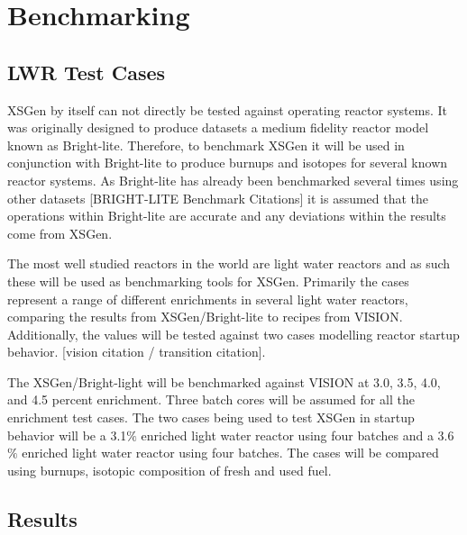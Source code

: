 \documentclass{article}
\begin{document}
\section{Benchmarking}
\subsection{LWR Test Cases}
XSGen by itself can not directly be tested against operating reactor systems. It was originally designed to produce datasets a medium fidelity reactor model known as Bright-lite. Therefore, to benchmark XSGen it will be used in conjunction with Bright-lite to produce burnups and isotopes for several known reactor systems.  As Bright-lite has already been benchmarked several times using other datasets [BRIGHT-LITE Benchmark Citations] it is assumed that the operations within Bright-lite are accurate and any deviations within the results come from XSGen.

The most well studied reactors in the world are light water reactors and as such these will be used as benchmarking tools for XSGen. Primarily the cases represent a range of different enrichments in several light water reactors, comparing the results from XSGen/Bright-lite to recipes from VISION. Additionally, the values will be tested against two cases modelling reactor startup behavior.  [vision citation / transition citation].

The XSGen/Bright-light will be benchmarked against VISION at 3.0, 3.5, 4.0, and 4.5 percent enrichment. Three batch cores will be assumed for all the enrichment test cases.
The two cases being used to test XSGen in startup behavior will be a 3.1$\%$ enriched light water reactor using four batches and a 3.6$\%$ enriched light water reactor using four batches. The cases will be compared using burnups, isotopic composition of fresh and used fuel.

\subsection{Results}
\end{document}
